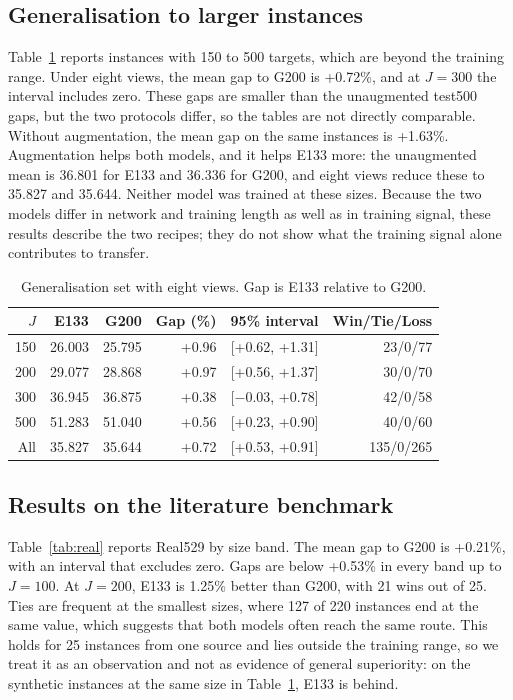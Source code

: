\documentclass[preprint,12pt,authoryear]{elsarticle}
\begin{document}
\subsection{Generalisation to larger instances}

Table~\ref{tab:gen} reports instances with 150 to 500 targets, which are beyond the training range. Under eight views, the mean gap to G200 is +0.72\%, and at $J = 300$ the interval includes zero. These gaps are smaller than the unaugmented test500 gaps, but the two protocols differ, so the tables are not directly comparable. Without augmentation, the mean gap on the same instances is +1.63\%. Augmentation helps both models, and it helps E133 more: the unaugmented mean is 36.801 for E133 and 36.336 for G200, and eight views reduce these to 35.827 and 35.644. Neither model was trained at these sizes. Because the two models differ in network and training length as well as in training signal, these results describe the two recipes; they do not show what the training signal alone contributes to transfer.

\begin{table}[t]
\centering
\caption{Generalisation set with eight views. Gap is E133 relative to G200.}
\label{tab:gen}
\small
\begin{tabular}{rrrrrr}
\toprule
$J$ & E133 & G200 & Gap (\%) & 95\% interval & Win/Tie/Loss \\
\midrule
150 & 26.003 & 25.795 & +0.96 & [+0.62, +1.31] & 23/0/77 \\
200 & 29.077 & 28.868 & +0.97 & [+0.56, +1.37] & 30/0/70 \\
300 & 36.945 & 36.875 & +0.38 & [$-$0.03, +0.78] & 42/0/58 \\
500 & 51.283 & 51.040 & +0.56 & [+0.23, +0.90] & 40/0/60 \\
All & 35.827 & 35.644 & +0.72 & [+0.53, +0.91] & 135/0/265 \\
\bottomrule
\end{tabular}
\end{table}

\subsection{Results on the literature benchmark}
\label{sec:real}

Table~\ref{tab:real} reports Real529 by size band. The mean gap to G200 is +0.21\%, with an interval that excludes zero. Gaps are below +0.53\% in every band up to $J = 100$. At $J = 200$, E133 is 1.25\% better than G200, with 21 wins out of 25. Ties are frequent at the smallest sizes, where 127 of 220 instances end at the same value, which suggests that both models often reach the same route. This holds for 25 instances from one source and lies outside the training range, so we treat it as an observation and not as evidence of general superiority: on the synthetic instances at the same size in Table~\ref{tab:gen}, E133 is behind.
\end{document}
